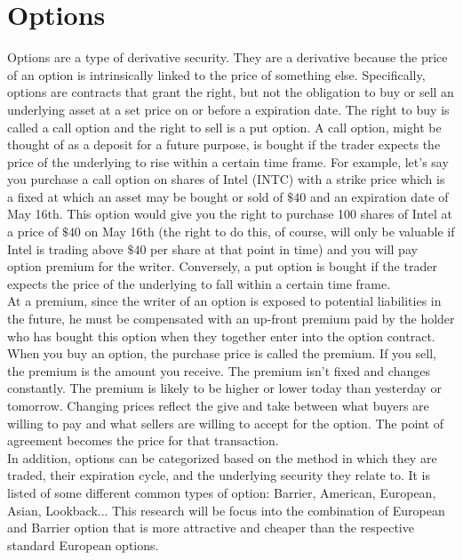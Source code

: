 \section{Options}
Options are a type of derivative security. They are a derivative because the price of an option is intrinsically linked to the price of something else. Specifically, options are contracts that grant the right, but not the obligation to buy or sell an underlying asset at a set price on or before a expiration date. The right to buy is called a call option and the right to sell is a put option. A call option, might be thought of as a deposit for a future purpose, is bought if the trader expects the price of the underlying to rise within a certain time frame. For example, let's say you purchase a call option on shares of Intel (INTC) with a strike price which is a fixed at which an asset may be bought or sold of $\$40$ and an expiration date of May 16th. This option would give you the right to purchase 100 shares of Intel at a price of $\$40$ on May 16th (the right to do this, of course, will only be valuable if Intel is trading above $\$40$ per share at that point in time) and you will pay option premium for the writer. Conversely, a put option is bought if the trader expects the price of the underlying to fall within a certain time frame.  \\[0.5cm]
At a premium, since the writer of an option is exposed to potential liabilities in the future, he must be compensated with an up-front premium paid by the holder who has bought this option when they together enter into the option contract.  When you buy an option, the purchase price is called the premium. If you sell, the premium is the amount you receive. The premium isn't fixed and changes constantly. The premium is likely to be higher or lower today than yesterday or tomorrow. Changing prices reflect the give and take between what buyers are willing to pay and what sellers are willing to accept for the option. The point of agreement becomes the price for that transaction. \\ [0.5cm]
In addition, options can be categorized based on the method in which they are traded, their expiration cycle, and the underlying security they relate to. It is listed of some different common types of option: Barrier,
American, European, Asian, Lookback... This research will be focus into the combination of European and Barrier option that is more attractive and cheaper than the respective standard European options. 
